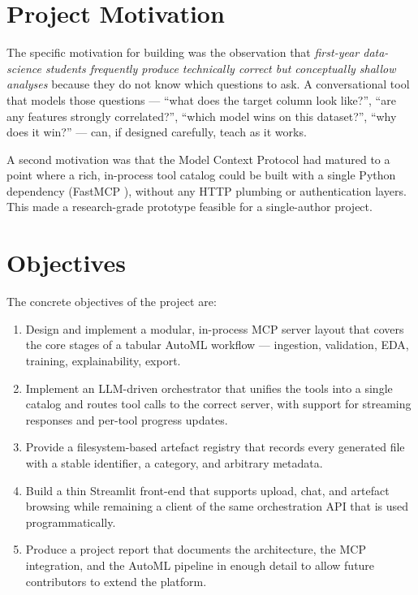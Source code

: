 \section{Project Motivation}
\label{sec:project-motivation}

The specific motivation for building \projname{} was the observation
that \emph{first-year data-science students frequently produce
technically correct but conceptually shallow analyses} because they
do not know which questions to ask. A conversational tool that models
those questions --- ``what does the target column look like?'', ``are
any features strongly correlated?'', ``which model wins on this
dataset?'', ``why does it win?'' --- can, if designed carefully,
teach as it works.

A second motivation was that the Model Context Protocol
\citep{mcpSpec2024} had matured to a point where a rich, in-process
tool catalog could be built with a single Python dependency (FastMCP
\citep{fastmcp}), without any HTTP plumbing or authentication layers.
This made a research-grade prototype feasible for a single-author
project.

\section{Objectives}
\label{sec:objectives}

The concrete objectives of the project are:

\begin{enumerate}[leftmargin=1.4em]
  \item Design and implement a modular, in-process MCP server layout
        that covers the core stages of a tabular AutoML workflow ---
        ingestion, validation, EDA, training, explainability, export.
  \item Implement an LLM-driven orchestrator that unifies the tools
        into a single catalog and routes tool calls to the correct
        server, with support for streaming responses and per-tool
        progress updates.
  \item Provide a filesystem-based artefact registry that records every
        generated file with a stable identifier, a category, and
        arbitrary metadata.
  \item Build a thin Streamlit front-end that supports upload, chat,
        and artefact browsing while remaining a client of the same
        orchestration API that is used programmatically.
  \item Produce a project report that documents the architecture, the
        MCP integration, and the AutoML pipeline in enough detail to
        allow future contributors to extend the platform.
\end{enumerate}


